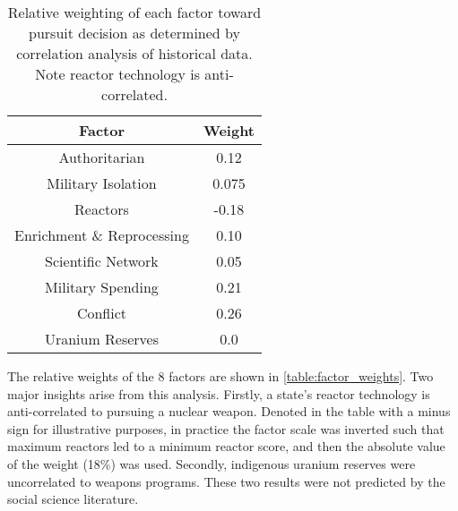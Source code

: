 \begin{table}
\centering
\begin{tabular}{|c|c|}
\hline
\textbf{Factor}        & \textbf{Weight} \\
\hline
Authoritarian   & 0.12 \\
Military Isolation & 0.075 \\
Reactors           & -0.18 \\
Enrichment \& Reprocessing & 0.10 \\
Scientific Network & 0.05 \\
Military Spending & 0.21 \\
Conflict  & 0.26 \\
Uranium Reserves &  0.0 \\
\hline
\end{tabular}
\caption{Relative weighting of each factor toward pursuit decision as determined by correlation analysis of historical data. Note reactor technology is anti-correlated.}
\label{tab:factor_weights}
\end{table}

The relative weights of the 8 factors are shown in \ref{table:factor_weights}.  Two major insights arise from this analysis. Firstly, a state's reactor technology is anti-correlated to pursuing a nuclear weapon.  Denoted in the table with a minus sign for illustrative purposes, in practice the factor scale was inverted such that maximum reactors led to a minimum reactor score, and then the absolute value of the weight (18\%) was used.  Secondly, indigenous uranium reserves were uncorrelated to weapons programs. These two results were not predicted by the social science literature.



\iffalse
\begin{figure}%
\begin{center}
\texttt{[image: ./figs/signatures\_table.pdf]}
\end{center}
\caption{Table of potential signatures across the fuel cycle: measureable through open, independent sources such as satellite imagery (green), available through official inspections (blue), or potentially unreliable due to physical or political constraints (yellow)\cite{kemp_environmental_2016,_plutonium_????,ferreira_radiometric_2012,stork_systematic_2006}.}
\label{fig:signatures}
\end{figure}
\fi


